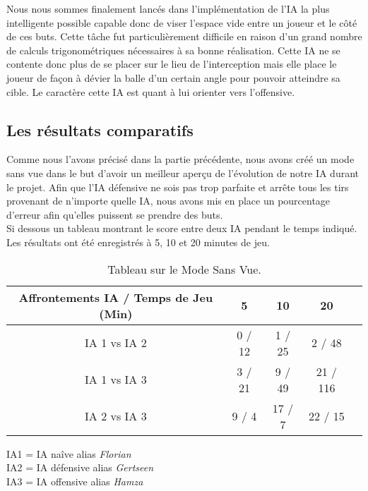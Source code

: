 Nous nous sommes finalement lancés dans l'implémentation de l'IA la plus intelligente possible capable donc de viser l'espace vide entre un joueur et le côté de ces buts. Cette tâche fut particulièrement difficile en raison d'un grand nombre de calculs trigonométriques nécessaires à sa bonne réalisation. Cette IA ne se contente donc plus de se placer sur le lieu de l'interception mais elle place le joueur de façon à dévier la balle d'un certain angle pour pouvoir atteindre sa cible. Le caractère cette IA est quant à lui orienter vers l'offensive.\\


\clearpage

\subsection{Les résultats comparatifs}

Comme nous l'avons précisé dans la partie précédente, nous avons créé un mode sans vue dans le but d'avoir un meilleur aperçu de l'évolution de notre IA durant le projet. Afin que l'IA défensive ne sois pas trop parfaite et arrête tous les tirs provenant de n'importe quelle IA, nous avons mis en place un pourcentage d'erreur afin qu'elles puissent se prendre des buts.\\

Si dessous un tableau montrant le score entre deux IA pendant le temps indiqué. Les résultats ont été enregistrés à 5, 10 et 20 minutes de jeu.

\begin{table}[ht]
  \begin{center}
    \begin{tabular}{|c|c|c|c|c|}
      \hline
      Affrontements IA / Temps de Jeu (Min) & 5 & 10 & 20\\
      \hline
      IA 1 vs IA 2& 0 / 12 & 1 / 25 & 2 / 48 \\
      \hline
      IA 1 vs IA 3& 3 / 21 & 9 / 49 & 21 / 116 \\
      \hline
      IA 2 vs IA 3& 9 / 4 & 17 / 7 & 22 / 15 \\
      \hline
    \end{tabular}
    \caption{Tableau sur le Mode Sans Vue.}
    \label{tab:un-tableau}
  \end{center}
    IA1 = IA naîve alias \emph{Florian}\\
    IA2 = IA défensive alias \emph{Gertseen}\\
    IA3 = IA offensive alias \emph{Hamza}
\end{table}



